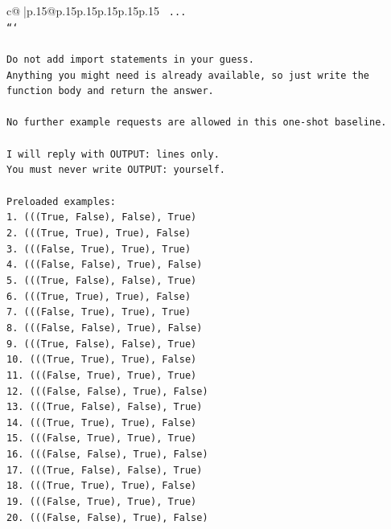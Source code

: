 \documentclass{article}
\begin{document}
{\begin{supertabular}{c@{$\;$}|p{.15\linewidth}@{}p{.15\linewidth}p{.15\linewidth}p{.15\linewidth}p{.15\linewidth}p{.15\linewidth}}
{{{\texttt{    ...} \\
\texttt{```} \\
\\ 
\texttt{Do not add import statements in your guess.} \\
\texttt{Anything you might need is already available, so just write the function body and return the answer.} \\
\\ 
\texttt{No further example requests are allowed in this one{-}shot baseline.} \\
\\ 
\texttt{I will reply with OUTPUT: lines only.} \\
\texttt{You must never write OUTPUT: yourself.} \\
\\ 
\texttt{Preloaded examples:} \\
\texttt{1. (((True, False), False), True)} \\
\texttt{2. (((True, True), True), False)} \\
\texttt{3. (((False, True), True), True)} \\
\texttt{4. (((False, False), True), False)} \\
\texttt{5. (((True, False), False), True)} \\
\texttt{6. (((True, True), True), False)} \\
\texttt{7. (((False, True), True), True)} \\
\texttt{8. (((False, False), True), False)} \\
\texttt{9. (((True, False), False), True)} \\
\texttt{10. (((True, True), True), False)} \\
\texttt{11. (((False, True), True), True)} \\
\texttt{12. (((False, False), True), False)} \\
\texttt{13. (((True, False), False), True)} \\
\texttt{14. (((True, True), True), False)} \\
\texttt{15. (((False, True), True), True)} \\
\texttt{16. (((False, False), True), False)} \\
\texttt{17. (((True, False), False), True)} \\
\texttt{18. (((True, True), True), False)} \\
\texttt{19. (((False, True), True), True)} \\
\texttt{20. (((False, False), True), False)} \\
}}}
\end{supertabular}}
\end{document}

